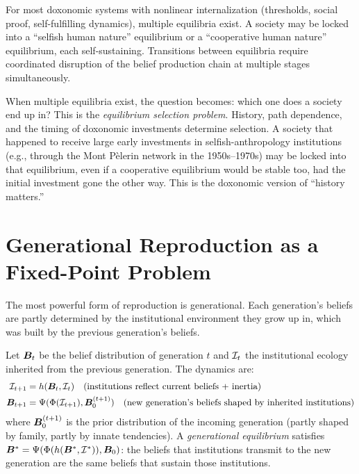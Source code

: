 \begin{conjecture}
\label{conj:multiplicity}
For most doxonomic systems with nonlinear internalization (thresholds, social proof, self-fulfilling dynamics), multiple equilibria exist.
A society may be locked into a ``selfish human nature'' equilibrium or a ``cooperative human nature'' equilibrium, each self-sustaining.
Transitions between equilibria require coordinated disruption of the belief production chain at multiple stages simultaneously.
\end{conjecture}

\begin{remark}
\label{rem:selection}
When multiple equilibria exist, the question becomes: which one does a society end up in?
This is the \emph{equilibrium selection problem}.
History, path dependence, and the timing of doxonomic investments determine selection.
A society that happened to receive large early investments in selfish-anthropology institutions (e.g., through the Mont P\`{e}lerin network in the 1950s--1970s) may be locked into that equilibrium, even if a cooperative equilibrium would be stable too, had the initial investment gone the other way.
This is the doxonomic version of ``history matters.''
\end{remark}


\section{Generational Reproduction as a Fixed-Point Problem}
\label{sec:ch5-generational}

The most powerful form of reproduction is generational.
Each generation's beliefs are partly determined by the institutional environment they grow up in, which was built by the previous generation's beliefs.

\begin{model}
\label{mod:generational}
Let $\bm{B}_t$ be the belief distribution of generation $t$ and $\mathcal{I}_t$ the institutional ecology inherited from the previous generation.
The dynamics are:
\begin{align}
  \mathcal{I}_{t+1} &= h(\bm{B}_t, \mathcal{I}_t) \quad \text{(institutions reflect current beliefs + inertia)} \\
  \bm{B}_{t+1} &= \Psi(\Phi(\mathcal{I}_{t+1}), \bm{B}_0^{(t+1)}) \quad \text{(new generation's beliefs shaped by inherited institutions)}
\end{align}
where $\bm{B}_0^{(t+1)}$ is the prior distribution of the incoming generation (partly shaped by family, partly by innate tendencies).
A \emph{generational equilibrium} satisfies $\bm{B}^* = \Psi(\Phi(h(\bm{B}^*, \mathcal{I}^*)), \bm{B}_0)$: the beliefs that institutions transmit to the new generation are the same beliefs that sustain those institutions.
\end{model}

